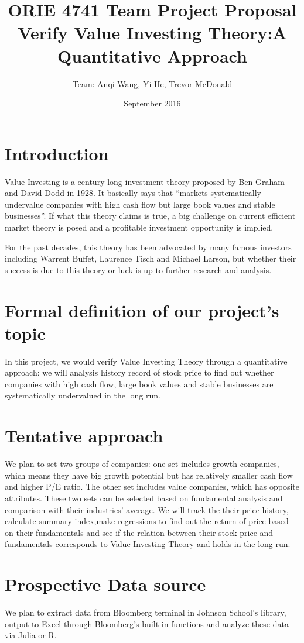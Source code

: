 \documentclass{article}
\title{ORIE 4741 Team Project Proposal\\  Verify Value Investing Theory:A Quantitative Approach}
\author{Team: Anqi Wang, Yi He, Trevor McDonald}
\date{September 2016}
\begin{document}
\maketitle

\section{Introduction}

\indent

Value Investing is a century long investment theory proposed by Ben Graham and David Dodd in 1928. It basically says that “markets systematically undervalue companies with high cash flow but large book values and stable businesses”. If what this theory claims is true, a big challenge on current efficient market theory is posed and a profitable investment opportunity is implied.

For the past decades, this theory has been advocated by many famous investors including Warrent Buffet, Laurence Tisch and Michael Larson, but whether their success is due to this theory or luck is up to further research and analysis.
\section{Formal definition of our project’s topic}
\indent

In this project, we would verify Value Investing Theory through a quantitative approach: we will analysis history record of stock price to find out whether companies with high cash flow, large book values and stable businesses are systematically undervalued in the long run.

\section{Tentative approach}
\indent

We plan to set two groups of companies: one set includes growth companies, which means they have big growth potential but has relatively smaller cash flow and higher P/E ratio. The other set includes value companies, which has opposite attributes. These two sets can be selected based on fundamental analysis and comparison with their industries’ average. We will track the their price history, calculate summary index,make regressions to find out the return of price based on their fundamentals and see if the relation between their stock price and fundamentals corresponds to Value Investing Theory and holds in the long run.

\section{Prospective Data source}
\indent

We plan to extract data from Bloomberg terminal in Johnson School’s library, output to Excel through Bloomberg’s built-in functions and analyze these data via Julia or R.
\end{document}
